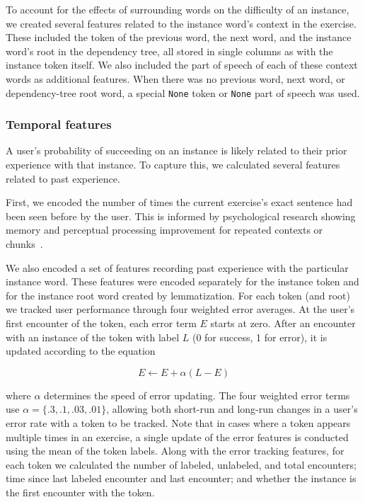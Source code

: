 \documentclass[11pt,a4paper]{article}
\begin{document}
To account for the effects of surrounding words on the difficulty of an
instance, we created several features related to the instance word's context in
the exercise. These included the token of the previous word, the next word, and
the instance word's root in the dependency tree, all stored in single columns as with
the instance token itself. We also included the part of speech of each of these
context words as additional features. When there was no previous word, next word, or dependency-tree
root word, a special {\tt None} token or {\tt None} part of speech was used.

\subsubsection{Temporal features}

A user's probability of succeeding on an instance is likely related to their
prior experience with that instance. To capture this, we calculated several
features related to past experience. 

First, we encoded the number of times the
current exercise's exact sentence had been seen before by the user. This is
informed by psychological research showing memory and perceptual processing
improvement for repeated contexts or chunks~\cite[e.g.,][]{Chun:1999gt}. 

We also encoded a set of features recording past experience with
the particular instance word. These features were encoded separately for the
instance token and for the instance root word created by lemmatization.
For each token (and root) we tracked user performance through four weighted
error averages. At the user's first encounter of the token, each error term $E$ starts at
zero. After an encounter with an instance of the token with label $L$ (0 for
success, 1 for error), it is
updated according to the equation

\[
E \leftarrow E + \alpha (L - E)
\]

where $\alpha$ determines the speed of error updating. The four weighted
error terms use $\alpha = \{.3, .1, .03, .01\}$, allowing both short-run and
long-run changes in a user's error rate with a token to be tracked. Note that in
cases where a token appears multiple times in an exercise, a single update of
the error features is conducted using the mean of the token labels.
Along with the error tracking features, for each token we calculated the number
of labeled, unlabeled, and total encounters; time since last labeled encounter and
last encounter; and whether the instance is the first encounter with the
token.
\end{document}
